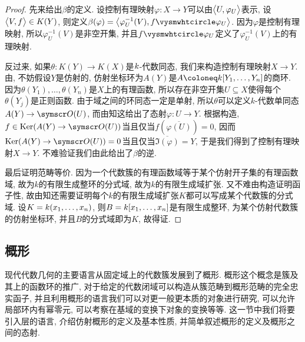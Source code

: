 \begin{proof}
  先来给出$\beta$的定义. 设控制有理映射$\varphi\colon X\to Y$可以由$\lrbig<>{U, \varphi_U}$表示, 设$\lrbig<>{V, f}\in K(Y)$, 则定义$\beta(\varphi)=\lrbig<>{\varphi_{U}^{-1}(V), f\composite \varphi_U}$. 因为$\varphi$是控制有理映射, 所以$\varphi_{U}^{-1}(V)$是非空开集, 并且$f\composite \varphi_U$定义了$\varphi_{U}^{-1}(V)$上的有理映射.

  反过来, 如果$\theta\colon K(Y)\to K(X)$是$\kk$-代数同态, 我们来构造控制有理映射$X\to Y$. 由, 不妨假设$Y$是仿射的, 仿射坐标环为$A(Y)$是$A\coloneq \kk [Y_1, \dotsc, Y_n]$的商环. 因为$\theta(Y_1), \dotsc, \theta(Y_n)$是$X$上的有理函数, 所以存在非空开集$U\subseteq X$使得每个$\theta(Y_j)$是正则函数. 由于域之间的环同态一定是单射, 所以$\theta$可以定义$k$-代数单同态$A(Y)\to \OO (U)$, 而由知这给出了态射$\varphi\colon U\to Y$. 根据构造, $f\in\Ker (A(Y)\to \OO (U))$当且仅当$f(\overline{\varphi (U)})=0$, 因而$\Ker (A(Y)\to \OO (U))=0$当且仅当$\overline{\Im (\varphi)}=Y$, 于是我们得到了控制有理映射$X\to Y$. 不难验证我们由此给出了$\beta$的逆.

  最后证明范畴等价. 因为一个代数簇的有理函数域等于某个仿射开子集的有理函数域, 故为$k$的有限生成整环的分式域, 故为$k$的有限生成域扩张. 又不难由构造证明函子性, 故由知还需要证明每个$k$的有限生成域扩张$K$都可以写成某个代数簇的分式域. 设$K=\kk (x_1, \dotsc, x_n)$, 则$B=\kk [x_1, \dotsc, x_n]$是有限生成整环, 为某个仿射代数簇的仿射坐标环, 并且$B$的分式域即为$K$, 故得证.
\end{proof}



\subsection{概形}\label{sec:ag-affinescheme}

现代代数几何的主要语言从固定域上的代数簇发展到了概形. 概形这个概念是簇及其上的函数环的推广, 对于给定的代数闭域可以构造从簇范畴到概形范畴的完全忠实函子, 并且利用概形的语言我们可以对更一般更本质的对象进行研究, 可以允许局部环内有幂零元, 可以考察在基域的变换下对象的变换等等. 这一节中我们将要引入层的语言, 介绍仿射概形的定义及基本性质, 并简单叙述概形的定义及概形之间的态射.

